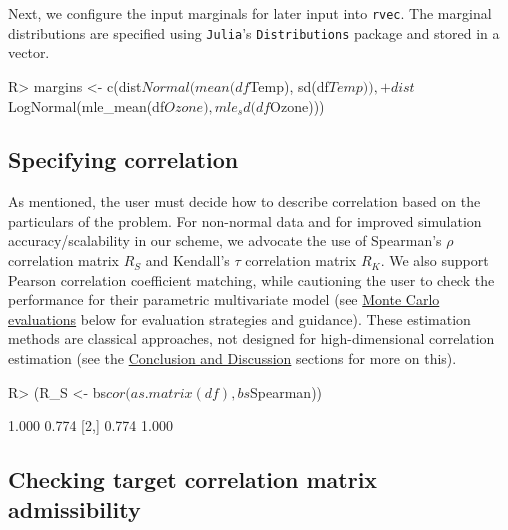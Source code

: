 \documentclass[
]{jss}
\begin{document}
Next, we configure the input marginals for later input into
\texttt{rvec}. The marginal distributions are specified using
\texttt{Julia}'s \texttt{Distributions} package and stored in a vector.

\begin{CodeChunk}
\begin{CodeInput}
R> margins <- c(dist$Normal(mean(df$Temp), sd(df$Temp)),
+              dist$LogNormal(mle_mean(df$Ozone), mle_sd(df$Ozone)))
\end{CodeInput}
\end{CodeChunk}

\hypertarget{specifying-correlation}{%
\subsection{Specifying correlation}\label{specifying-correlation}}

As mentioned, the user must decide how to describe correlation based on
the particulars of the problem. For non-normal data and for improved
simulation accuracy/scalability in our scheme, we advocate the use of
Spearman's \(\rho\) correlation matrix \(R_S\) and Kendall's \(\tau\)
correlation matrix \(R_K\). We also support Pearson correlation
coefficient matching, while cautioning the user to check the performance
for their parametric multivariate model (see
\protect\hyperlink{simulations}{Monte Carlo evaluations} below for
evaluation strategies and guidance). These estimation methods are
classical approaches, not designed for high-dimensional correlation
estimation (see the \href{\%7B\#discussion}{Conclusion and Discussion}
sections for more on this).

\begin{CodeChunk}
\begin{CodeInput}
R> (R_S <- bs$cor(as.matrix(df), bs$Spearman))
\end{CodeInput}
\begin{CodeOutput}
      [,1]  [,2]
[1,] 1.000 0.774
[2,] 0.774 1.000
\end{CodeOutput}
\end{CodeChunk}

\hypertarget{checking-target-correlation-matrix-admissibility}{%
\subsection{Checking target correlation matrix
admissibility}\label{checking-target-correlation-matrix-admissibility}}
\end{document}

